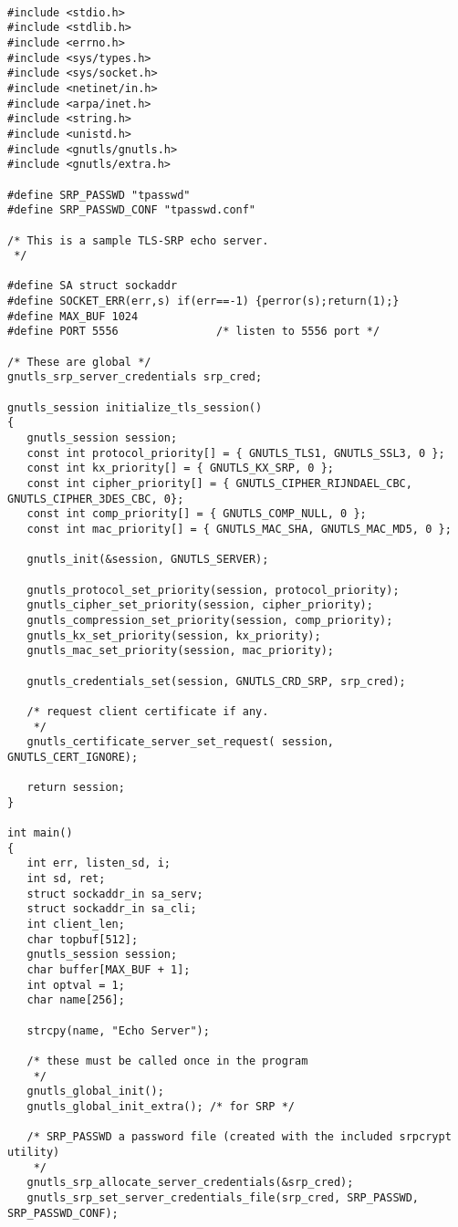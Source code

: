 \begin{verbatim}

#include <stdio.h>
#include <stdlib.h>
#include <errno.h>
#include <sys/types.h>
#include <sys/socket.h>
#include <netinet/in.h>
#include <arpa/inet.h>
#include <string.h>
#include <unistd.h>
#include <gnutls/gnutls.h>
#include <gnutls/extra.h>

#define SRP_PASSWD "tpasswd"
#define SRP_PASSWD_CONF "tpasswd.conf"

/* This is a sample TLS-SRP echo server.
 */

#define SA struct sockaddr
#define SOCKET_ERR(err,s) if(err==-1) {perror(s);return(1);}
#define MAX_BUF 1024
#define PORT 5556               /* listen to 5556 port */

/* These are global */
gnutls_srp_server_credentials srp_cred;

gnutls_session initialize_tls_session()
{
   gnutls_session session;
   const int protocol_priority[] = { GNUTLS_TLS1, GNUTLS_SSL3, 0 };
   const int kx_priority[] = { GNUTLS_KX_SRP, 0 };
   const int cipher_priority[] = { GNUTLS_CIPHER_RIJNDAEL_CBC, GNUTLS_CIPHER_3DES_CBC, 0};
   const int comp_priority[] = { GNUTLS_COMP_NULL, 0 };
   const int mac_priority[] = { GNUTLS_MAC_SHA, GNUTLS_MAC_MD5, 0 };

   gnutls_init(&session, GNUTLS_SERVER);

   gnutls_protocol_set_priority(session, protocol_priority);
   gnutls_cipher_set_priority(session, cipher_priority);
   gnutls_compression_set_priority(session, comp_priority);
   gnutls_kx_set_priority(session, kx_priority);
   gnutls_mac_set_priority(session, mac_priority);

   gnutls_credentials_set(session, GNUTLS_CRD_SRP, srp_cred);

   /* request client certificate if any.
    */
   gnutls_certificate_server_set_request( session, GNUTLS_CERT_IGNORE);

   return session;
}

int main()
{
   int err, listen_sd, i;
   int sd, ret;
   struct sockaddr_in sa_serv;
   struct sockaddr_in sa_cli;
   int client_len;
   char topbuf[512];
   gnutls_session session;
   char buffer[MAX_BUF + 1];
   int optval = 1;
   char name[256];

   strcpy(name, "Echo Server");

   /* these must be called once in the program
    */
   gnutls_global_init();
   gnutls_global_init_extra(); /* for SRP */

   /* SRP_PASSWD a password file (created with the included srpcrypt utility) 
    */
   gnutls_srp_allocate_server_credentials(&srp_cred);
   gnutls_srp_set_server_credentials_file(srp_cred, SRP_PASSWD, SRP_PASSWD_CONF);



\end{verbatim}
